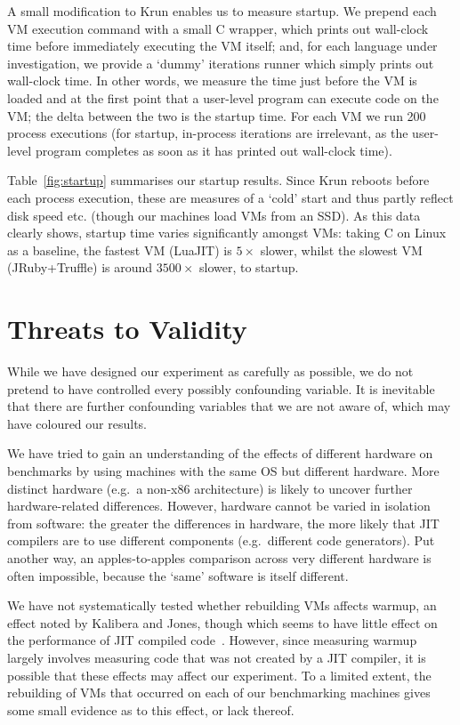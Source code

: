 \documentclass[acmsmall,screen]{acmart}
\newcommand{\kalibera}{Kalibera and Jones\xspace}
\newcommand{\krun}{Krun\xspace}
\newcommand{\numstartuppexecs}{200\xspace}
\begin{document}
A small modification to \krun enables us to measure startup. We prepend each VM
execution command with a small C wrapper, which prints out wall-clock time
before immediately executing the VM itself; and, for each language under
investigation, we provide a `dummy' iterations runner which simply prints out
wall-clock time. In other words, we measure the time just before the VM is loaded
and at the first point that a user-level program can execute code on the VM; the
delta between the two is the startup time. For each VM we run \numstartuppexecs process
executions (for startup, in-process iterations are irrelevant,
as the user-level program completes as soon as it has printed out wall-clock
time).

Table~\ref{fig:startup} summarises our startup results. Since
\krun reboots before each process execution, these are measures of a `cold'
start and thus partly reflect disk speed etc. (though our machines load VMs
from an SSD). As this data clearly shows, startup time varies significantly amongst VMs:
taking C on Linux as a baseline, the fastest VM (LuaJIT) is $5\times$ slower, whilst the
slowest VM (JRuby+Truffle) is around $3500\times$ slower, to startup.


\section{Threats to Validity}
\label{sec:threats}

While we have designed our experiment as carefully as possible, we do not
pretend to have controlled every possibly confounding variable. It
is inevitable that there are further confounding variables that
we are not aware of, which may have coloured our results.

We have tried to gain an understanding of the effects of different
hardware on benchmarks by using machines with the same OS but
different hardware.
More distinct hardware (e.g.~a non-x86 architecture)
is likely to uncover further hardware-related differences.
However, hardware cannot be varied in isolation from software:
the greater the differences in hardware, the more likely that JIT compilers
are to use different components (e.g.~different code generators).
Put another way, an apples-to-apples comparison across very different
hardware is often impossible, because the `same' software is itself different.

We have not systematically tested whether rebuilding VMs affects warmup, an
effect noted by \kalibera, though which seems to have little effect on
the performance of JIT compiled code~\cite{barrett15approaches}. However, since measuring warmup largely
involves measuring code that was not created by a JIT compiler, it is possible
that these effects may affect our experiment. To a limited extent, the
rebuilding of VMs that occurred on each of our benchmarking machines gives
some small evidence as to this effect, or lack thereof.
\end{document}
